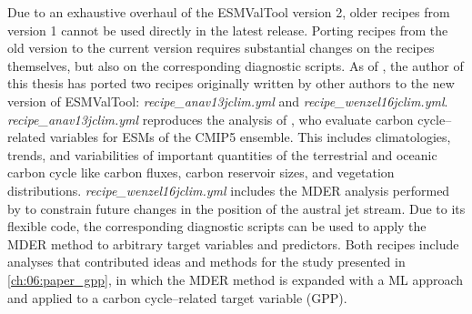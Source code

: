Due to an exhaustive overhaul of the \ac{ESMValTool} version 2, older recipes
from version 1 \autocite{Eyring2016a} cannot be used directly in the latest
release. Porting recipes from the old version to the current version requires
substantial changes on the recipes themselves, but also on the corresponding
diagnostic scripts. As of \TheMonth{}, the author of this thesis has ported two
recipes originally written by other authors to the new version of
\ac{ESMValTool}: \emph{recipe\_anav13jclim.yml} and
\emph{recipe\_wenzel16jclim.yml}. \emph{recipe\_anav13jclim.yml} reproduces the
analysis of \textcite{Anav2013}, who evaluate carbon cycle--related variables
for \acp{ESM} of the \acs{CMIP}5 ensemble. This includes climatologies, trends,
and variabilities of important quantities of the terrestrial and oceanic carbon
cycle like carbon fluxes, carbon reservoir sizes, and vegetation distributions.
\emph{recipe\_wenzel16jclim.yml} includes the \ac{MDER} analysis performed by
\textcite{Wenzel2016a} to constrain future changes in the position of the
austral jet stream. Due to its flexible code, the corresponding diagnostic
scripts can be used to apply the \ac{MDER} method to arbitrary target variables
and predictors. Both recipes include analyses that contributed ideas and
methods for the study presented in \cref{ch:06:paper_gpp}, in which the
\ac{MDER} method is expanded with a \ac{ML} approach and applied to a carbon
cycle--related target variable (\ac{GPP}).

